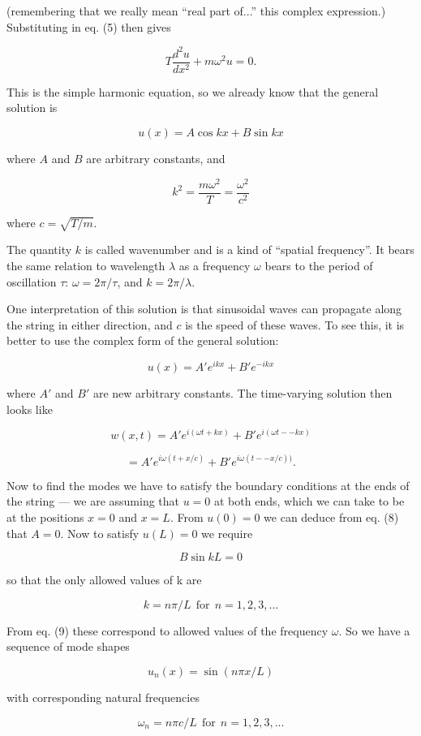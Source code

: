   (remembering that we really mean ``real part of...'' this complex 
  expression.) Substituting in eq. (5) then gives 

  $$T \dfrac{d^2u}{dx^2} + m \omega^2 u = 0. \tag{7}$$ 

  This is the simple harmonic equation, so we already know that the general 
  solution is 

  $$u(x) = A \cos kx + B \sin kx \tag{8}$$ 

  where $A$ and $B$ are arbitrary constants, and 

  $$k^2 =\dfrac{m \omega^2}{T} = \dfrac{\omega^2}{c^2} \tag{9}$$ 

  where $c=\sqrt{T/m}$. 

  The quantity $k$ is called wavenumber and is a kind of ``spatial frequency''. 
  It bears the same relation to wavelength $\lambda$ as a frequency $\omega$ 
  bears to the period of oscillation $\tau$: $\omega=2 \pi/\tau$, and $k=2 
  \pi/\lambda$. 

  One interpretation of this solution is that sinusoidal waves can propagate 
  along the string in either direction, and $c$ is the speed of these waves. To 
  see this, it is better to use the complex form of the general solution: 

  $$u(x) =A' e^{ikx} + B' e^{-ikx} \tag{10}$$ 

  where $A'$ and $B'$ are new arbitrary constants. The time-varying solution 
  then looks like 

  $$w(x,t) = A' e^{i(\omega t + kx)} + B' e^{i(\omega t -- kx)} \tag{11}$$ 

  $$=A' e^{i\omega (t + x/c)} + B' e^{i\omega (t -- x/c))}. \tag{12}$$ 

  Now to find the modes we have to satisfy the boundary conditions at the ends 
  of the string --- we are assuming that $u = 0$ at both ends, which we can 
  take to be at the positions $x = 0$ and $x = L$. From $u(0) = 0$ we can 
  deduce from eq. (8) that $A = 0$. Now to satisfy $u(L) = 0$ we require 

  $$B \sin kL = 0 \tag{12}$$ 

  so that the only allowed values of k are 

  $$k=n \pi/L \mathrm{~~for~~} n = 1, 2, 3, ... \tag{13}$$ 

  From eq. (9) these correspond to allowed values of the frequency $\omega$. So 
  we have a sequence of mode shapes 

  $$u_n(x)=\sin (n \pi x/L) \tag{14}$$ 

  with corresponding natural frequencies 

  $$\omega_n = n \pi c/L \mathrm{~~for~~} n = 1, 2, 3, ... \tag{15}$$ 